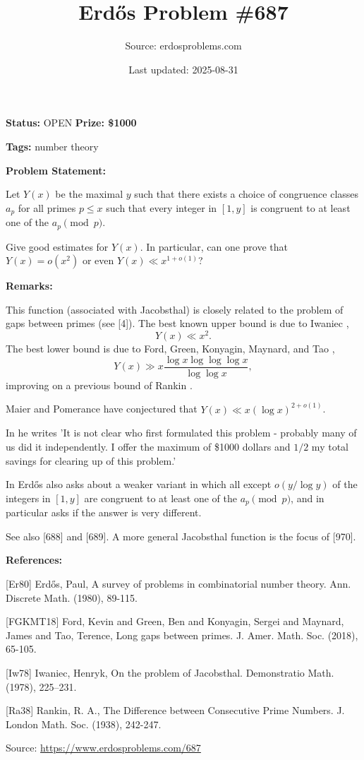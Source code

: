 \documentclass{article}
\title{Erd\H{o}s Problem \#687}
\date{Last updated: 2025-08-31}
\author{Source: erdosproblems.com}
\begin{document}
\maketitle

\noindent\textbf{Status:} OPEN \quad \textbf{Prize: \$1000}

\noindent\textbf{Tags:} number theory

\medskip
\noindent\textbf{Problem Statement:}

Let $Y(x)$ be the maximal $y$ such that there exists a choice of congruence classes $a_p$ for all primes $p\leq x$ such that every integer in $[1,y]$ is congruent to at least one of the $a_p\pmod{p}$. 

Give good estimates for $Y(x)$. In particular, can one prove that $Y(x)=o(x^2)$ or even $Y(x)\ll x^{1+o(1)}$?

\bigskip
\noindent\textbf{Remarks:}

This function (associated with Jacobsthal) is closely related to the problem of gaps between primes (see [4]). The best known upper bound is due to Iwaniec \cite{Iw78},\[Y(x) \ll x^2.\]The best lower bound is due to Ford, Green, Konyagin, Maynard, and Tao \cite{FGKMT18},\[Y(x) \gg x\frac{\log x\log\log\log x}{\log\log x},\]improving on a previous bound of Rankin \cite{Ra38}. 

Maier and Pomerance have conjectured that $Y(x)\ll x(\log x)^{2+o(1)}$. 

In \cite{Er80} he writes 'It is not clear who first formulated this problem - probably many of us did it independently. I offer the maximum of \$1000 dollars and $1/2$ my total savings for clearing up of this problem.'

In \cite{Er80} Erd\H{o}s also asks about a weaker variant in which all except $o(y/\log y)$ of the integers in $[1,y]$ are congruent to at least one of the $a_p\pmod{p}$, and in particular asks if the answer is very different.

See also [688] and [689]. A more general Jacobsthal function is the focus of [970].

\bigskip
\noindent\textbf{References:}

[Er80] Erd\H{o}s, Paul, A survey of problems in combinatorial number theory. Ann. Discrete Math. (1980), 89-115.
 
 [FGKMT18] Ford, Kevin and Green, Ben and Konyagin, Sergei and Maynard, James and Tao, Terence, Long gaps between primes. J. Amer. Math. Soc. (2018), 65-105.
 
 [Iw78] Iwaniec, Henryk, On the problem of {J}acobsthal. Demonstratio Math. (1978), 225--231.
 
 [Ra38] Rankin, R. A., The Difference between Consecutive Prime Numbers. J. London Math. Soc. (1938), 242-247.

\bigskip
\noindent\small{Source: \url{https://www.erdosproblems.com/687}}
\end{document}
